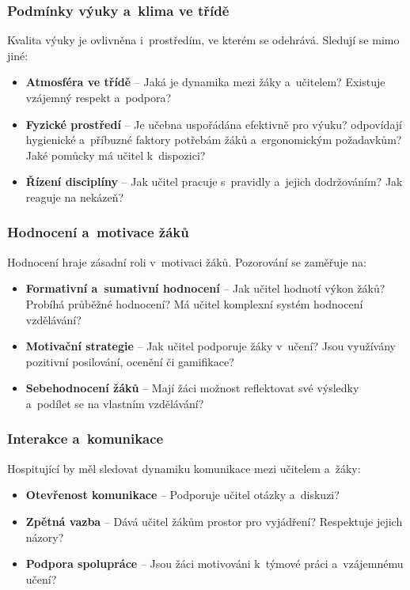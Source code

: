 \subsubsection{Podmínky výuky a~klima ve třídě}
Kvalita výuky je ovlivněna i~prostředím, ve kterém se odehrává. Sledují se mimo jiné:
\begin{itemize}
    \item \textbf{Atmosféra ve třídě} – Jaká je dynamika mezi žáky a~učitelem? Existuje vzájemný respekt a~podpora?
    \item \textbf{Fyzické prostředí} – Je učebna uspořádána efektivně pro výuku? odpovídají hygienické a~příbuzné faktory potřebám žáků a~ergonomickým požadavkům? Jaké pomůcky má učitel k~dispozici?
    \item \textbf{Řízení disciplíny} – Jak učitel pracuje s~pravidly a~jejich dodržováním? Jak reaguje na nekázeň?
\end{itemize}

\subsubsection{Hodnocení a~motivace žáků}
Hodnocení hraje zásadní roli v~motivaci žáků. Pozorování se zaměřuje na:
\begin{itemize}
    \item \textbf{Formativní a~sumativní hodnocení} – Jak učitel hodnotí výkon žáků? Probíhá průběžné hodnocení? Má učitel komplexní systém hodnocení vzdělávání?
    \item \textbf{Motivační strategie} – Jak učitel podporuje žáky v~učení? Jsou využívány pozitivní posilování, ocenění či gamifikace?
    \item \textbf{Sebehodnocení žáků} – Mají žáci možnost reflektovat své výsledky a~podílet se na vlastním vzdělávání?

\end{itemize}

\subsubsection{Interakce a~komunikace}
Hospitující by měl sledovat dynamiku komunikace mezi učitelem a~žáky:
\begin{itemize}
    \item \textbf{Otevřenost komunikace} – Podporuje učitel otázky a~diskuzi?
    \item \textbf{Zpětná vazba} – Dává učitel žákům prostor pro vyjádření? Respektuje jejich názory?
    \item \textbf{Podpora spolupráce} – Jsou žáci motivováni k~týmové práci a~vzájemnému učení?
\end{itemize}


